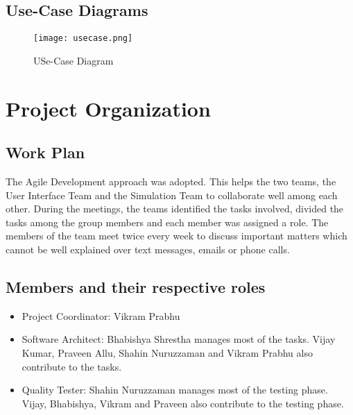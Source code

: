 \documentclass[11pt]{article}
\begin{document}
\subsection{Use-Case Diagrams}

\begin{figure}[!ht]
\centering
\texttt{[image: usecase.png]}
\caption{\label{fig:usecase}USe-Case Diagram}
\end{figure}

\section{Project Organization}

\subsection{Work Plan}

The Agile Development approach was adopted. This helps the two teams, the User Interface Team and the Simulation Team to collaborate well among each other. During the meetings, the teams identified the tasks involved, divided the tasks among the group members and each member was assigned a role. The members of the team meet twice every week to discuss important matters which cannot be well explained over text messages, emails or phone calls.

\subsection{Members and their respective roles}

\begin{itemize}
\item Project Coordinator: Vikram Prabhu
\end{itemize}

\begin{itemize}
\item Software Architect: Bhabishya Shrestha manages most of the tasks. Vijay Kumar, Praveen Allu, Shahin Nuruzzaman and Vikram Prabhu also contribute to the tasks.
\end{itemize}

\begin{itemize}
\item Quality Tester: Shahin Nuruzzaman manages most of the testing phase. Vijay, Bhabishya, Vikram and Praveen also contribute to the testing phase.
\end{itemize}
\end{document}
